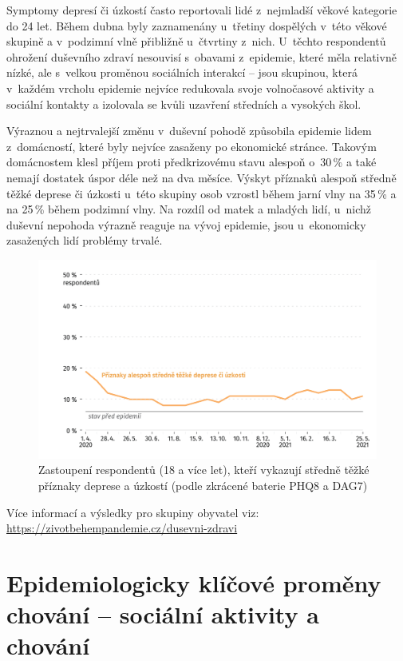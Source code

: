 Symptomy depresí či úzkostí často reportovali lidé z~nejmladší věkové kategorie do 24 let. Během dubna byly zaznamenány u~třetiny dospělých v této věkové skupině a v podzimní vlně přibližně u~čtvrtiny z~nich. U~těchto respondentů ohrožení duševního zdraví nesouvisí s obavami z epidemie, které měla relativně nízké, ale s velkou proměnou sociálních interakcí – jsou skupinou, která v každém vrcholu epidemie nejvíce redukovala svoje volnočasové aktivity a sociální kontakty a izolovala se kvůli uzavření středních a vysokých škol.

Výraznou a nejtrvalejší změnu v~duševní pohodě způsobila epidemie lidem z do\-mác\-nos\-tí, které byly nejvíce zasaženy po ekonomické stránce. Takovým domácnostem klesl příjem proti předkrizovému stavu alespoň o~30\,\% a také nemají dostatek úspor déle než na dva měsíce. Výskyt příznaků alespoň středně těžké deprese či úzkosti u~této skupiny osob vzrostl během jarní vlny na 35\,\% a na 25\,\% během podzimní vlny. Na rozdíl od matek a mladých lidí, u~nichž duševní nepohoda výrazně reaguje na vývoj epidemie, jsou u~ekonomicky zasažených lidí problémy trvalé.


\begin{figure}[ht]
    \centering
    \includegraphics[width=\textwidth]{./pic/zbp-graf2.png}
    \caption{Zastoupení respondentů (18 a více let), kteří vykazují středně těžké příznaky deprese a úzkostí (podle zkrácené baterie PHQ8 a DAG7)}
    \label{fig:zbp2}
\end{figure}

Více informací a výsledky pro skupiny obyvatel viz: \url{https://zivotbehempandemie.cz/dusevni-zdravi}


\section*{Epidemiologicky klíčové proměny chování – sociální aktivity a chování}
\label{Epidemi_promeny}

